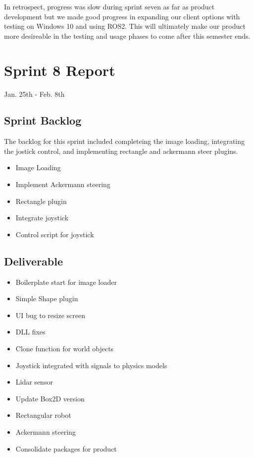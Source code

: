 In retrospect, progress was slow during sprint seven as far as product development but we made good progress in expanding our client options with testing on Windows 10 and using ROS2. This will ultimately make our product more desireable in the testing and usage phases to come after this semester ends.


\section{Sprint 8 Report}
Jan. 25th - Feb. 8th
\subsection{Sprint Backlog}

The backlog for this sprint included completeing the image loading, integrating the jostick control, and implementing rectangle and ackermann steer plugins.

\begin{itemize}
	\item Image Loading
	\item Implement Ackermann steering
	\item Rectangle plugin
	\item Integrate joystick
	\item Control script for joystick
\end{itemize}

\subsection{Deliverable}

\begin{itemize}
	\item Boilerplate start for image loader
	\item Simple Shape plugin
	\item UI bug to resize screen
	\item DLL fixes
	\item Clone function for world objects
	\item Joystick integrated with signals to physics models
	\item Lidar sensor
	\item Update Box2D version
	\item Rectangular robot
	\item Ackermann steering
	\item Consolidate packages for product
\end{itemize}

